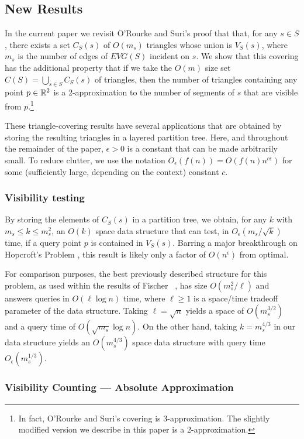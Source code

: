 \documentclass{patmorin}
\newcommand{\EVG}{\mathit{EVG}}
\newcommand{\Oe}{O_\epsilon}
\begin{document}
\subsection{New Results}

In the current paper we revisit O'Rourke and Suri's proof that that,
for any $s\in S$, there exists a set $C_S(s)$ of $O(m_s)$ triangles
whose union is $V_S(s)$, where $m_s$ is the number of edges of $\EVG(S)$
incident on $s$.  We show that this covering has the additional property
that if we take the $O(m)$ size set $C(S)=\bigcup_{s\in S}C_S(s)$ of
triangles, then the number of triangles containing any point $p\in\mathbb{R}^2$
is a 2-approximation to the number of segments of $s$ that are visible
from $p$.\footnote{In fact, O'Rourke and Suri's covering is
3-approximation.  The slightly modified version we describe in this paper is a
2-approximation.}

These triangle-covering results have several applications that are
obtained by storing the resulting triangles in a layered partition tree.
Here, and throughout the remainder of the paper, $\epsilon > 0$ is a
constant that can be made arbitrarily small. To reduce clutter, we use the
notation $\Oe(f(n))=O(f(n)n^{c\epsilon})$ for some (sufficiently large,
depending on the context) constant $c$.

\subsubsection{Visibility testing} 

By storing the elements of $C_S(s)$ in a partition tree, we obtain, for
any $k$ with $m_s\le k\le m_s^2$, an $O(k)$ space data structure that can
test, in $\Oe(m_s/\sqrt{k})$ time, if a query point $p$ is contained in
$V_S(s)$.  Barring a major breakthrough on Hopcroft's Problem \cite{e96},
this result is likely only a factor of $O(n^\epsilon)$ from optimal.

For comparison purposes, the best previously described structure
for this problem, as used within the results of Fischer \etal\
\cite{fhjmz08,fhjmz09}, has size $O(m_{s}^2/\ell)$ and answers queries
in $O(\ell\log n)$ time, where $\ell \ge 1$ is a space/time tradeoff
parameter of the data structure.  Taking $\ell=\sqrt{n}$ yields a space
of $O(m_s^{3/2})$ and a query time of $O(\sqrt{m_s}\log n)$.  On the other
hand, taking $k=m_s^{4/3}$ in our data structure yields an $O(m_s^{4/3})$
space data structure with query time $\Oe(m_s^{1/3})$.

\subsubsection{Visibility Counting --- Absolute Approximation}
\end{document}
